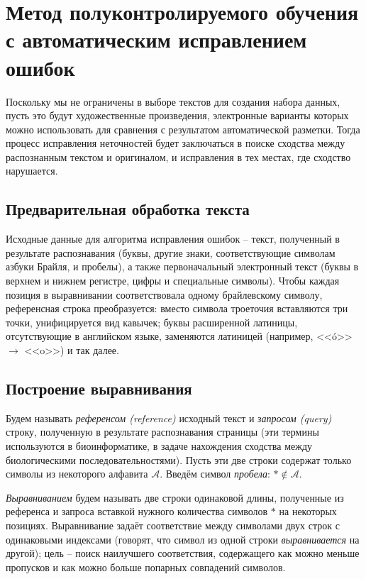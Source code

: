 \documentclass{main.tex}[subfiles]
\begin{document}
\section{Метод полуконтролируемого обучения с автоматическим исправлением ошибок}

Поскольку мы не ограничены в выборе текстов для создания набора данных, пусть это будут художественные произведения, электронные варианты которых можно использовать для сравнения с результатом автоматической разметки.
Тогда процесс исправления неточностей будет заключаться в поиске сходства между распознанным текстом и оригиналом, и исправления в тех местах, где сходство нарушается.

\subsection{Предварительная обработка текста}\label{subsection:preprocessing}

Исходные данные для алгоритма исправления ошибок -- текст, полученный в результате распознавания (буквы, другие знаки, соответствующие символам азбуки Брайля, и пробелы), а также первоначальный электронный текст (буквы в верхнем и нижнем регистре, цифры и специальные символы).
Чтобы каждая позиция в выравнивании соответствовала одному брайлевскому символу, референсная строка преобразуется: вместо символа троеточия вставляются три точки, унифицируется вид кавычек; буквы расширенной латиницы, отсутствующие в английском языке, заменяются латиницей (например, <<\'o>> $\rightarrow$ <<o>>) и так далее.

\subsection{Построение выравнивания}
Будем называть \emph{референсом (reference)} исходный текст и \emph{запросом (query)} строку, полученную в результате распознавания страницы (эти термины используются в биоинформатике, в задаче нахождения сходства между биологическими последовательностями).
Пусть эти две строки содержат только символы из некоторого алфавита $\mathcal A $. Введём символ \emph{пробела}: $ \ast \notin \mathcal A $.

\emph{Выравниванием} будем называть две строки одинаковой длины, полученные из референса и запроса вставкой нужного количества символов $\ast$ на некоторых позициях.
Выравнивание задаёт соответствие между символами двух строк с одинаковыми индексами (говорят, что символ из одной строки \emph{выравнивается} на другой); цель -- поиск наилучшего соответствия, содержащего как можно меньше пропусков и как можно больше попарных совпадений символов.
\end{document}
